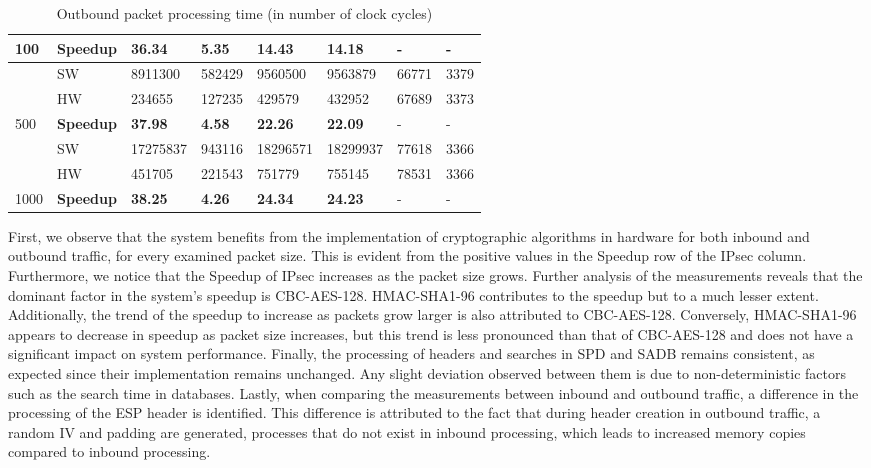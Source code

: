\begin{table}[]
\begin{tabular}{llllllll}
\multirow{-3}{*}{100}      & {\color[HTML]{00B050} \textbf{Speedup}}   & {\color[HTML]{00B050} \textbf{36.34}}   & {\color[HTML]{00B050} \textbf{5.35}} & {\color[HTML]{00B050} \textbf{14.43}} & {\color[HTML]{00B050} \textbf{14.18}} & -       & - \\
\midrule
      & SW    & 8911300   & 582429    & 9560500    & 9563879    & 66771      & 3379 \\
      & HW    & 234655    & 127235    & 429579  & 432952  & 67689      & 3373 \\
\multirow{-3}{*}{500}      & {\color[HTML]{00B050} \textbf{Speedup}}   & {\color[HTML]{00B050} \textbf{37.98}}   & {\color[HTML]{00B050} \textbf{4.58}} & {\color[HTML]{00B050} \textbf{22.26}} & {\color[HTML]{00B050} \textbf{22.09}} & -       & - \\
\midrule
      & SW    & 17275837     & 943116    & 18296571   & 18299937   & 77618      & 3366 \\
      & HW    & 451705    & 221543    & 751779  & 755145  & 78531      & 3366 \\
\multirow{-3}{*}{1000}     & {\color[HTML]{00B050} \textbf{Speedup}}   & {\color[HTML]{00B050} \textbf{38.25}}   & {\color[HTML]{00B050} \textbf{4.26}} & {\color[HTML]{00B050} \textbf{24.34}} & {\color[HTML]{00B050} \textbf{24.23}} & -       & -     \\
\bottomrule
\end{tabular}
\caption{Outbound packet processing time (in number of clock cycles)}
\label{table:7.2}
\end{table}


First, we observe that the system benefits from the implementation of cryptographic algorithms in hardware for both inbound and outbound traffic, for every examined packet size. This is evident from the positive values in the Speedup row of the IPsec column. Furthermore, we notice that the Speedup of IPsec increases as the packet size grows. Further analysis of the measurements reveals that the dominant factor in the system's speedup is CBC-AES-128. HMAC-SHA1-96 contributes to the speedup but to a much lesser extent. Additionally, the trend of the speedup to increase as packets grow larger is also attributed to CBC-AES-128. Conversely, HMAC-SHA1-96 appears to decrease in speedup as packet size increases, but this trend is less pronounced than that of CBC-AES-128 and does not have a significant impact on system performance. Finally, the processing of headers and searches in SPD and SADB remains consistent, as expected since their implementation remains unchanged. Any slight deviation observed between them is due to non-deterministic factors such as the search time in databases. Lastly, when comparing the measurements between inbound and outbound traffic, a difference in the processing of the ESP header is identified. This difference is attributed to the fact that during header creation in outbound traffic, a random IV and padding are generated, processes that do not exist in inbound processing, which leads to increased memory copies compared to inbound processing.

